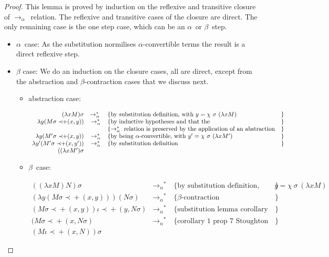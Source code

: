 \documentclass{article}
\newcommand{\betaalpha}{\ensuremath{\rightarrow_\alpha}}
\newcommand{\alp}{\ensuremath{\alpha}}
\newcommand{\lam}{\ensuremath{\lambda}}
\newcommand{\choice}{\ensuremath{\chi}}
\newcommand{\add}[2]{\ensuremath{\prec\!\!+(#1,#2)}}
\begin{document}
\begin{proof} 
This lemma is proved by induction on the reflexive and transitive closure of $\betaalpha$\ relation. The reflexive and transitive cases of the closure are direct. The only remaining case is the one step case, which can be an \alp\ or $\beta$\ step.

\begin{itemize}
 \item \alp\ case: As the substitution normilises \alp-convertible terms the result is a direct reflexive step.
 \item $\beta$ case: We do an induction on the closure cases, all are direct, except from the abstraction and $\beta$-contraction cases that we discuss next.

   \begin{itemize}
   \item abstraction case:

   \[ \begin{array}{rcll}
       (\lam x M) \sigma & \betaalpha^*\ & \{\text{by substitution definition, with}\ y = \choice\ \sigma\ (\lam x M) &\} \\
       \lam y (M \sigma \add{x}{y}) & \betaalpha^* & \{\text{by inductive hypotheses and that the} &\} \\
                                    &              &\{ \betaalpha^* \text{ relation is preserved by the application of an abstraction} &\} \\
 
       \lam y (M' \sigma \add{x}{y}) & \betaalpha^*& \{\text{by being \alp-convertible, with}\ y' = \choice\ \sigma\ (\lam x M') &\} \\
       \lam y' (M' \sigma \add{x}{y'}) & \betaalpha^*& \{\text{by substitution definition} &\} \\
       ((\lam x M') \sigma &&&
   \end{array} \]
   \item $\beta$\  case:

   \[ \begin{array}{rcll}
       ((\lam x M) N) \sigma & \betaalpha^*\ & \{\text{by substitution definition, with}\ y = \choice\ \sigma\ (\lam x M) &\} \\
       (\lam y (M \sigma \add{x}{y})) (N \sigma) & \betaalpha^* & \{\beta\text{-contraction} &\} \\
       (M \sigma \add{x}{y}) \iota \add{y}{N \sigma}  & \betaalpha^* & \{\text{substitution lemma corollary 1} &\} \\
       (M \sigma \add{x}{N \sigma}  & \betaalpha^* & \{\text{corollary 1 prop 7 Stoughton} &\} \\
       (M \iota \add{x}{N}) \sigma &&&
       \end{array} \]
  
   \end{itemize}
\end{itemize}
  
\end{proof}
\end{document}
